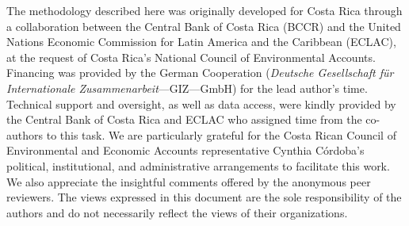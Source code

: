\documentclass[
  letterpaper,
  DIV=11,
  numbers=noendperiod]{scrartcl}
\begin{document}
The methodology described here was originally developed for Costa Rica
through a collaboration between the Central Bank of Costa Rica (BCCR)
and the United Nations Economic Commission for Latin America and the
Caribbean (ECLAC), at the request of Costa Rica's National Council of
Environmental Accounts. Financing was provided by the German Cooperation
(\emph{Deutsche Gesellschaft für Internationale
Zusammenarbeit}---GIZ---GmbH) for the lead author's time. Technical
support and oversight, as well as data access, were kindly provided by
the Central Bank of Costa Rica and ECLAC who assigned time from the
co-authors to this task. We are particularly grateful for the Costa
Rican Council of Environmental and Economic Accounts representative
Cynthia Córdoba's political, institutional, and administrative
arrangements to facilitate this work. We also appreciate the insightful
comments offered by the anonymous peer reviewers. The views expressed in
this document are the sole responsibility of the authors and do not
necessarily reflect the views of their organizations.
\end{document}
